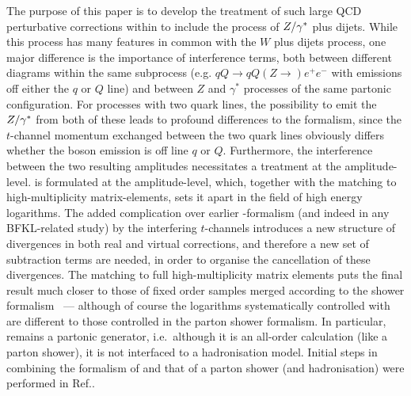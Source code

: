	The purpose of this paper is to develop the treatment of such large QCD
	perturbative corrections within \hej to include the process of $Z/\gamma^*$ plus
	dijets. While this process has many features in
	common with the $W$ plus dijets process, one major difference is the
	importance of interference terms, both between different diagrams within the
	same subprocess (e.g. $qQ\to qQ(Z\to)e^+e^-$ with emissions off either the $q$ or
	$Q$ line) and between $Z$ and $\gamma^*$
	processes of the same partonic configuration. For processes with two quark
	lines, the possibility to emit the $Z/\gamma^*$ from both of these leads to profound
	differences to the formalism, since the $t$-channel momentum exchanged
	between the two quark lines obviously differs whether the boson emission is
	off line $q$ or $Q$. Furthermore, the interference between the two resulting
	amplitudes necessitates a treatment at the amplitude-level. \hej is
	formulated
	 at the amplitude-level, which, together with the matching to
	 high-multiplicity matrix-elements, sets it apart in the field of
	high energy
	logarithms\cite{Kuraev:1976ge,Balitsky:1978ic,Lonnblad:1992tz,Lavesson:2005xu,Jung:2000hk,Jung:2010si,Colferai:2010wu,Caporale:2012ih,Ducloue:2012bm}. The
	added complication over earlier \hej-formalism (and indeed in any
	BFKL-related study) by the interfering $t$-channels introduces a new structure of divergences in both real and virtual
	corrections, and therefore a new set of subtraction terms are needed, in
	order to
	organise the cancellation of these divergences. The matching to full
	high-multiplicity matrix elements puts the final result much closer to those
	of fixed order samples merged according to the shower
	formalism~\cite{Re:2012zi,Campbell:2013vha,Hoeche:2012yf,Frederix:2015eii}
	--- although of course the logarithms systematically controlled with \hej are
	different to those controlled in the parton shower formalism. In particular,
	\hej remains a partonic generator, i.e.~although it is an all-order
	calculation (like a parton shower), it is not interfaced to a hadronisation
	model. Initial steps in combining the formalism of \hej and that of a parton
	shower (and hadronisation) were performed in Ref.\cite{Andersen:2011zd}.

